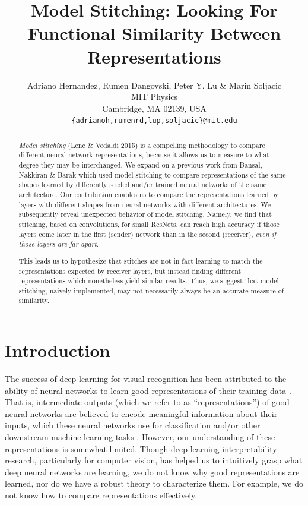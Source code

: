 \documentclass{article}
\title{Model Stitching: Looking For Functional Similarity Between Representations}
\author{Adriano Hernandez, Rumen Dangovski, Peter Y. Lu \& Marin Soljacic\\
MIT Physics\\
Cambridge, MA 02139, USA \\
\texttt{\{adrianoh,rumenrd,lup,soljacic\}@mit.edu}
}
\begin{document}
\maketitle

\begin{abstract}
  \textit{Model stitching} (Lenc \& Vedaldi 2015) is a compelling methodology to compare
  different neural network representations, because it allows us to measure to
  what degree they may be interchanged.
  We expand on a previous work from Bansal, Nakkiran \& Barak which used model stitching to
  compare representations of the same shapes learned by differently seeded
  and/or trained neural networks of the same architecture.
  Our contribution enables us to compare the representations learned by layers with
  different shapes from neural networks with different architectures.
  We subsequently reveal unexpected behavior of model stitching. Namely, we find that stitching, 
  based on convolutions, for small ResNets, can reach
  high accuracy if those layers come later in the first (sender) network than in
  the second (receiver), \textit{even if those layers are far apart}. 

  This leads us to hypothesize that stitches are not in fact learning to match the
  representations expected by receiver layers, but instead finding different representations which nonetheless
  yield similar results. Thus, we suggest that model stitching, naively implemented, may not necessarily always be an
  accurate measure of similarity.
\end{abstract}

\section{Introduction}
The success of deep learning for visual recognition has been attributed to the ability of neural networks to learn
good representations of their training data \cite{Rumelhart1986LearningIR}. That is, intermediate outputs (which we refer
to as ``representations'') of good neural networks 
are believed to encode meaningful information about their inputs, which these neural networks use for classification and/or other
downstream machine learning tasks \cite{goodfellow2016deep}.
However, our understanding of these representations is somewhat limited. Though
deep learning interpretability research, particularly for computer vision, has helped us
to intuitively grasp what deep neural 
networks are learning, we do not
know why good representations are learned, nor do we have a robust theory to characterize them. For example, we do not
know how to compare representations effectively.
\end{document}
